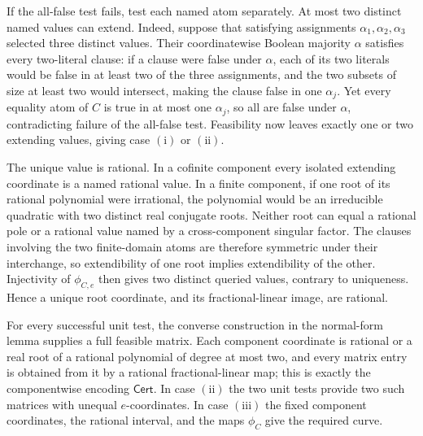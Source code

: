 If the all-false test fails, test each named atom separately.  At most two distinct named values can extend.  Indeed, suppose that satisfying assignments \(\alpha_1,\alpha_2,\alpha_3\) selected three distinct values.  Their coordinatewise Boolean majority \(\alpha\) satisfies every two-literal clause: if a clause were false under \(\alpha\), each of its two literals would be false in at least two of the three assignments, and the two subsets of size at least two would intersect, making the clause false in one \(\alpha_j\).  Yet every equality atom of \(C\) is true in at most one \(\alpha_j\), so all are false under \(\alpha\), contradicting failure of the all-false test.  Feasibility now leaves exactly one or two extending values, giving case \(\mathrm{(i)}\) or \(\mathrm{(ii)}\).

The unique value is rational.  In a cofinite component every isolated extending coordinate is a named rational value.  In a finite component, if one root of its rational polynomial were irrational, the polynomial would be an irreducible quadratic with two distinct real conjugate roots.  Neither root can equal a rational pole or a rational value named by a cross-component singular factor.  The clauses involving the two finite-domain atoms are therefore symmetric under their interchange, so extendibility of one root implies extendibility of the other.  Injectivity of \(\phi_{C,e}\) then gives two distinct queried values, contrary to uniqueness.  Hence a unique root coordinate, and its fractional-linear image, are rational.

For every successful unit test, the converse construction in the normal-form lemma supplies a full feasible matrix.  Each component coordinate is rational or a real root of a rational polynomial of degree at most two, and every matrix entry is obtained from it by a rational fractional-linear map; this is exactly the componentwise encoding \(\mathsf{Cert}\).  In case \(\mathrm{(ii)}\) the two unit tests provide two such matrices with unequal \(e\)-coordinates.  In case \(\mathrm{(iii)}\) the fixed component coordinates, the rational interval, and the maps \(\phi_C\) give the required curve.

